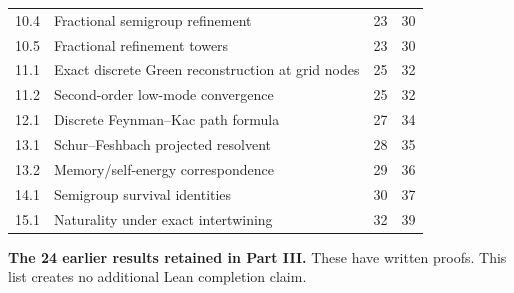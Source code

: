 \begin{longtable}{@{}p{.12\linewidth}p{.61\linewidth}rr@{}}
10.4 & Fractional semigroup refinement & 23 & 30\\
10.5 & Fractional refinement towers & 23 & 30\\
11.1 & Exact discrete Green reconstruction at grid nodes & 25 & 32\\
11.2 & Second-order low-mode convergence & 25 & 32\\
12.1 & Discrete Feynman--Kac path formula & 27 & 34\\
13.1 & Schur--Feshbach projected resolvent & 28 & 35\\
13.2 & Memory/self-energy correspondence & 29 & 36\\
14.1 & Semigroup survival identities & 30 & 37\\
15.1 & Naturality under exact intertwining & 32 & 39\\
\bottomrule\end{longtable}
\textbf{The 24 earlier results retained in Part III.} These have written proofs. This list creates no additional Lean completion claim.
